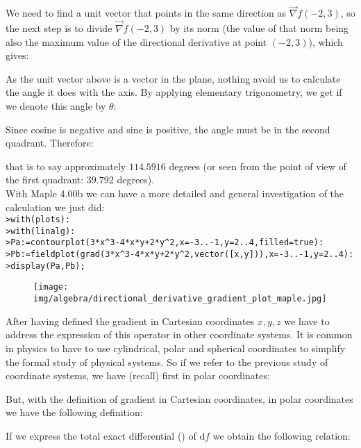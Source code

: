 	\begin{tcolorbox}[colframe=black,colback=white,sharp corners]
	We need to find a unit vector that points in the same direction as $\vec{\nabla}f(-2,3)$, so the next step is to divide $\vec{\nabla}f(-2,3)$ by its norm (the value of that norm being also the maximum value of the directional derivative at point $(-2,3)$), which gives:
	
	As the unit vector above is a vector in the plane, nothing avoid us to calculate the angle it does with the axis. By applying elementary trigonometry, we get if we denote this angle by $\theta$:
	
	Since cosine is negative and sine is positive, the angle must be in the second quadrant. Therefore:
	
	that is to say approximately $114.5916$ degrees (or seen from the point of view of the first quadrant: $39.792$ degrees).\\
	
	With Maple 4.00b we can have a more detailed and general investigation of the calculation we just did:\\

	\texttt{>with(plots):\\
	>with(linalg):\\
	>Pa:=contourplot(3*x\string^3-4*x*y+2*y\string^2,x=-3..-1,y=2..4,filled=true):\\
	>Pb:=fieldplot(grad(3*x\string^3-4*x*y+2*y\string^2,vector([x,y])),x=-3..-1,y=2..4):\\
	>display(Pa,Pb);
	}
	\begin{figure}[H]
		\centering
		\texttt{[image: img/algebra/directional\_derivative\_gradient\_plot\_maple.jpg]}
	\end{figure}
	\end{tcolorbox}
	After having defined the gradient in Cartesian coordinates $x, y, z$ we have to address the expression of this operator in other coordinate systems. It is common in physics to have to use cylindrical, polar and spherical coordinates to simplify the formal study of physical systems. So if we refer to the previous study of coordinate systems, we have (recall) first in polar coordinates:
	
	But, with the definition of gradient in Cartesian coordinates, in polar coordinates we have the following definition:
	
	If we express the total exact differential () of $\mathrm{d}f$ we obtain the following relation:
	
